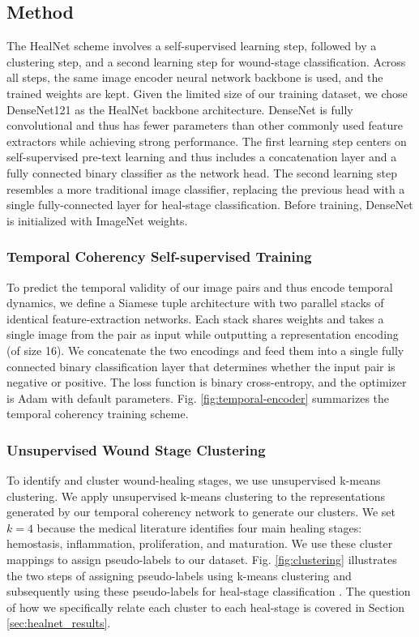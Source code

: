 \documentclass[11pt]{ucthesis}
\begin{document}
\subsection{Method}
The HealNet scheme involves a self-supervised learning step, followed by a clustering step, and a second learning step for wound-stage classification. Across all steps, the same image encoder neural network backbone is used, and the trained weights are kept. Given the limited size of our training dataset, we chose DenseNet121 \cite{huang2017densely} as the HealNet backbone architecture. DenseNet is fully convolutional and thus has fewer parameters than other commonly used feature extractors while achieving strong performance. The first learning step centers on self-supervised pre-text learning and thus includes a concatenation layer and a fully connected binary classifier as the network head. The second learning step resembles a more traditional image classifier, replacing the previous head with a single fully-connected layer for heal-stage classification. Before training, DenseNet is initialized with ImageNet  \cite{deng2009imagenet} weights.

\subsubsection{Temporal Coherency Self-supervised Training}
To predict the temporal validity of our image pairs and thus encode temporal dynamics, we define a Siamese tuple architecture \cite{bromley1993signature} with two parallel stacks of identical feature-extraction networks. Each stack shares weights and takes a single image from the pair as input while outputting a representation encoding (of size 16). We concatenate the two encodings and feed them into a single fully connected binary classification layer that determines whether the input pair is negative or positive. The loss function is binary cross-entropy, and the optimizer is Adam \cite{kingma2014adam} with default parameters. Fig. \ref{fig:temporal-encoder} summarizes the temporal coherency training scheme.

\subsubsection{Unsupervised Wound Stage Clustering}
To identify and cluster wound-healing stages, we use unsupervised k-means clustering. We apply unsupervised k-means clustering to the representations generated by our temporal coherency network to generate our clusters. We set $k=4$ because the medical literature identifies four main healing stages: hemostasis, inflammation, proliferation, and maturation. We use these cluster mappings to assign pseudo-labels to our dataset. Fig. \ref{fig:clustering} illustrates the two steps of assigning pseudo-labels using k-means clustering and subsequently using these pseudo-labels for heal-stage classification \cite{yan2020clusterfit}. The question of how we specifically relate each cluster to each heal-stage is covered in Section \ref{sec:healnet_results}.
\end{document}
